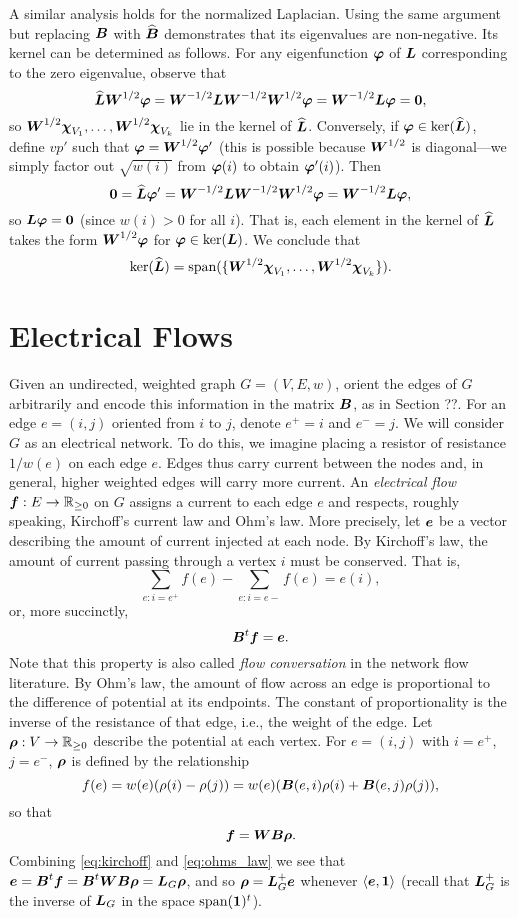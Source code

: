 A similar analysis holds for the normalized Laplacian. Using the same argument but replacing $\vb*{B}$ with $\widehat{\vb*{B}}$ demonstrates that its eigenvalues are non-negative. Its kernel can be determined as follows. For any eigenfunction $\vb*{\varphi}$ of $\vb*{L}$ corresponding to the zero eigenvalue, observe that 
\[\widehat{\vb*{L}}\vb*{W}^{1/2}\vb*{\varphi} = \vb*{W}^{-1/2}\vb*{L}\vb*{W}^{-1/2}\vb*{W}^{1/2}\vb*{\varphi} = \vb*{W}^{-1/2}\vb*{L}\vb*{\varphi} = \vb{0},\]
so $\vb*{W}^{1/2}\boldsymbol{\chi}_{V_1},\dots,\vb*{W}^{1/2}\boldsymbol{\chi}_{V_k}$ lie in the kernel of $\widehat{\vb*{L}}$.
Conversely, if $\vb*{\varphi}\in\ker(\widehat{\vb*{L}})$, define $vp'$ such that $\vb*{\varphi}=\vb*{W}^{1/2}\vb*{\varphi}'$ (this is possible because $\vb*{W}^{1/2}$ is diagonal---we simply factor out $\sqrt{w(i)}$ from $\vb*{\varphi}(i)$ to obtain $\vb*{\varphi}'(i)$). Then 
\[\vb{0} =\widehat{\vb*{L}}\vb*{\varphi}' = \vb*{W}^{-1/2}\vb*{L} \vb*{W}^{-1/2}\vb*{W}^{1/2}\vb*{\varphi} = \vb*{W}^{-1/2}\vb*{L}\vb*{\varphi},\]
so $\vb*{L}\vb*{\varphi}=\vb{0}$ (since $w(i)>0$ for all $i$). That is, each element in the kernel of $\widehat{\vb*{L}}$ takes the form $\vb*{W}^{1/2}\vb*{\varphi}$ for $\vb*{\varphi}\in\ker(\vb*{L})$. We conclude that 
\[\ker(\widehat{\vb*{L}})=\textnormal{span}(\{\vb*{W}^{1/2}\boldsymbol{\chi}_{V_1},\dots,\vb*{W}^{1/2}\boldsymbol{\chi}_{V_k}\}).\]


\section{Electrical Flows}
\label{sec:background_er}
Given an undirected, weighted graph $G=(V,E,w)$, orient the edges of $G$ arbitrarily and encode this information in the matrix $\vb*{B}$, as in Section ??. For an edge $e=(i,j)$ oriented from $i$ to $j$, denote $e^+=i$ and $e^-=j$. 
We will consider $G$ as an electrical network. To do this, we imagine placing a resistor of resistance $1/w(e)$ on each edge $e$. Edges thus carry current between the nodes and, in general, higher weighted edges will carry more current.  
An \emph{electrical flow $\vb*{f}:E\to\mathbb{R}_{\geq 0}$} on $G$ assigns a current to each edge $e$ and respects, roughly speaking, Kirchoff's current law and Ohm's law. More precisely, let $\vb*{e}$ be a vector describing the amount of current injected at each node. By Kirchoff's law, the amount of current passing through a vertex $i$ must be conserved. That is, 
\[\sum_{e:i=e^+}f(e) - \sum_{e:i=e-}f(e) = e(i),\]
or, more succinctly, 
\begin{equation}
\label{eq:kirchoff}
\vb*{B}^t \vb*{f}=\vb*{e}. 
\end{equation}
Note that this property is also called \emph{flow conversation} in the network flow literature. 
By Ohm's law, the amount of flow across an edge is proportional to the difference of potential at its endpoints. The constant of proportionality is the inverse of the resistance of that edge, i.e., the weight of the edge. Let $\vb*{\rho}:V\to\mathbb{R}_{\geq 0}$ describe the potential at each vertex. For $e=(i,j)$ with $i=e^+$, $j=e^-$, $\vb*{\rho}$ is defined by the relationship 
\begin{equation*}
f(e) = w(e)(\rho(i)-\rho(j)) = w(e) (\vb*{B}(e,i)\rho(i) + \vb*{B}(e,j)\rho(j)),
\end{equation*}
so that
\begin{equation}
\label{eq:ohms_law}
\vb*{f}=\vb*{W}\vb*{B}\vb*{\rho}.
\end{equation}
Combining \eqref{eq:kirchoff} and \eqref{eq:ohms_law} we see that $\vb*{e}=\vb*{B}^t \vb*{f}=\vb*{B}^t \vb*{W}\vb*{B} \vb*{\rho} = \vb*{L}_G\vb*{\rho}$, and so $\vb*{\rho} = \vb*{L}_G^+\vb*{e}$ whenever $\langle \vb*{e},\vb{1}\rangle$ (recall that $\vb*{L}_G^+$ is the inverse of $\vb*{L}_G$ in the space $\textnormal{span}(\vb{1})^t$).  

